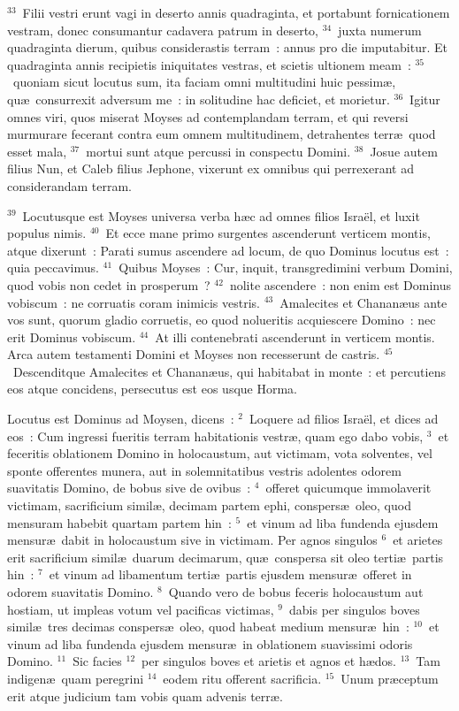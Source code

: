 ${}^{33}$~Filii vestri erunt vagi in deserto annis quadraginta, et portabunt fornicationem vestram, donec consumantur cadavera patrum in deserto,
${}^{34}$~juxta numerum quadraginta dierum, quibus considerastis terram~: annus pro die imputabitur. Et quadraginta annis recipietis iniquitates vestras, et scietis ultionem meam~:
${}^{35}$~quoniam sicut locutus sum, ita faciam omni multitudini huic pessim\ae , qu\ae\ consurrexit adversum me~: in solitudine hac deficiet, et morietur.
${}^{36}$~Igitur omnes viri, quos miserat Moyses ad contemplandam terram, et qui reversi murmurare fecerant contra eum omnem multitudinem, detrahentes terr\ae\ quod esset mala,
${}^{37}$~mortui sunt atque percussi in conspectu Domini.
${}^{38}$~Josue autem filius Nun, et Caleb filius Jephone, vixerunt ex omnibus qui perrexerant ad considerandam terram.


${}^{39}$~Locutusque est Moyses universa verba h\ae c ad omnes filios Isra\"el, et luxit populus nimis.
${}^{40}$~Et ecce mane primo surgentes ascenderunt verticem montis, atque dixerunt~: Parati sumus ascendere ad locum, de quo Dominus locutus est~: quia peccavimus.
${}^{41}$~Quibus Moyses~: Cur, inquit, transgredimini verbum Domini, quod vobis non cedet in prosperum~?
${}^{42}$~nolite ascendere~: non enim est Dominus vobiscum~: ne corruatis coram inimicis vestris.
${}^{43}$~Amalecites et Chanan\ae us ante vos sunt, quorum gladio corruetis, eo quod nolueritis acquiescere Domino~: nec erit Dominus vobiscum.
${}^{44}$~At illi contenebrati ascenderunt in verticem montis. Arca autem testamenti Domini et Moyses non recesserunt de castris.
${}^{45}$~Descenditque Amalecites et Chanan\ae us, qui habitabat in monte~: et percutiens eos atque concidens, persecutus est eos usque Horma.

\lettrine[lines=3,image=true,loversize=0.05,lraise=-0.03]{L}{}ocutus est Dominus ad Moysen, dicens~:
${}^{2}$~Loquere ad filios Isra\"el, et dices ad eos~: Cum ingressi fueritis terram habitationis vestr\ae , quam ego dabo vobis,
${}^{3}$~et feceritis oblationem Domino in holocaustum, aut victimam, vota solventes, vel sponte offerentes munera, aut in solemnitatibus vestris adolentes odorem suavitatis Domino, de bobus sive de ovibus~:
${}^{4}$~offeret quicumque immolaverit victimam, sacrificium simil\ae , decimam partem ephi, conspers\ae\ oleo, quod mensuram habebit quartam partem hin~:
${}^{5}$~et vinum ad liba fundenda ejusdem mensur\ae\ dabit in holocaustum sive in victimam. Per agnos singulos
${}^{6}$~et arietes erit sacrificium simil\ae\ duarum decimarum, qu\ae\ conspersa sit oleo terti\ae\ partis hin~:
${}^{7}$~et vinum ad libamentum terti\ae\ partis ejusdem mensur\ae\ offeret in odorem suavitatis Domino.
${}^{8}$~Quando vero de bobus feceris holocaustum aut hostiam, ut impleas votum vel pacificas victimas,
${}^{9}$~dabis per singulos boves simil\ae\ tres decimas conspers\ae\ oleo, quod habeat medium mensur\ae\ hin~:
${}^{10}$~et vinum ad liba fundenda ejusdem mensur\ae\ in oblationem suavissimi odoris Domino.
${}^{11}$~Sic facies
${}^{12}$~per singulos boves et arietis et agnos et h\ae dos.
${}^{13}$~Tam indigen\ae\ quam peregrini
${}^{14}$~eodem ritu offerent sacrificia.
${}^{15}$~Unum pr\ae ceptum erit atque judicium tam vobis quam advenis terr\ae .


